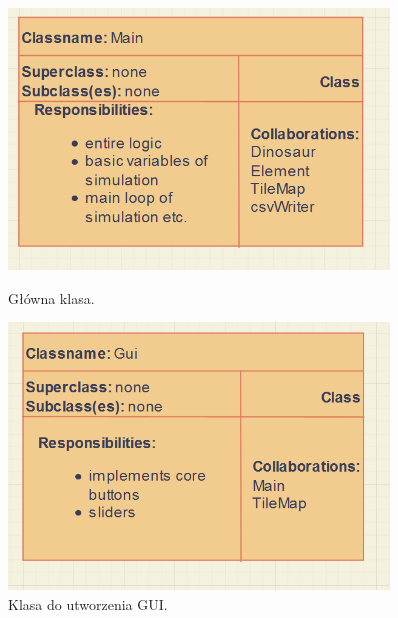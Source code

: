 \begin{figure}[h!]
    \centering
    \begin{minipage}{0.45\textwidth}
        \centering
        \includegraphics[width=0.9\textwidth]{images/crc/main_crc.png} %
        \caption{Główna klasa.}
    \end{minipage}\hfill
    \begin{minipage}{0.45\textwidth}
        \centering
        \includegraphics[width=0.9\textwidth]{images/crc/gui_crc.png} %
        \caption{Klasa do utworzenia GUI.}
    \end{minipage}
\end{figure}


